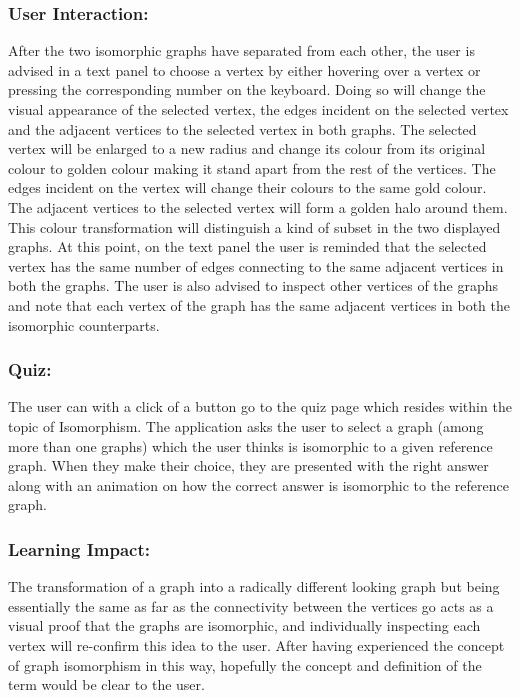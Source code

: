 \subsubsection{User Interaction:}
After the two isomorphic graphs have separated from each other, the user is
advised in a text panel to choose a vertex by either hovering over a vertex or
pressing the corresponding number on the keyboard. Doing so will change the
visual appearance of the selected vertex, the edges incident on the selected
vertex and the adjacent vertices to the selected vertex in both graphs.  The
selected vertex will be enlarged to a new radius and change its colour from its
original colour to golden colour making it stand apart from the rest of the
vertices.  The edges incident on the vertex will change their colours to the
same gold colour.  The adjacent vertices to the selected vertex will form a
golden halo around them.  This colour transformation will distinguish a kind of subset in the two displayed graphs. At this point, on the text panel
the user is reminded that the selected vertex has the same number of edges
connecting to the same adjacent vertices in both the graphs. The user is also
advised to inspect other vertices of the graphs and note that each
vertex of the graph has the same adjacent vertices in both the isomorphic
counterparts.

\subsubsection{Quiz:}
The user can with a click of a button go to the quiz page which resides within
the topic of Isomorphism. The application asks the user to select a graph (among more than
one graphs) which the user thinks is isomorphic to a given reference graph.  When
they make their choice, they are presented with the right answer along with an animation on
how the correct answer is isomorphic to the reference graph.

\subsubsection{Learning Impact:}
The transformation of a graph into a radically different looking graph but
being essentially the same as far as the connectivity between the vertices go
acts as a visual proof that the graphs are isomorphic, and individually
inspecting each vertex will re-confirm this idea to the user. After having
experienced the concept of graph isomorphism in this way, hopefully the
concept and definition of the term would be clear to the user.


